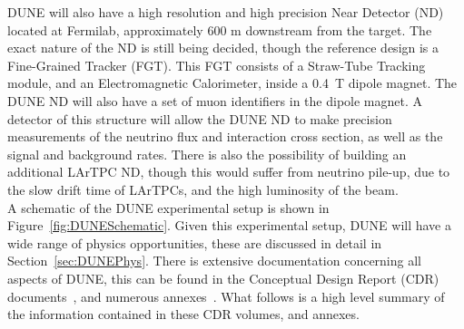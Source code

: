 DUNE will also have a high resolution and high precision Near Detector (ND) located at Fermilab, approximately 600 m downstream from the target. The exact nature of the ND is still being decided, though the reference design is a Fine-Grained Tracker (FGT). This FGT consists of a Straw-Tube Tracking module, and an Electromagnetic Calorimeter, inside a 0.4~T dipole magnet. The DUNE ND will also have a set of muon identifiers in the dipole magnet. A detector of this structure will allow the DUNE ND to make precision measurements of the neutrino flux and interaction cross section, as well as the signal and background rates. There is also the possibility of building an additional LArTPC ND, though this would suffer from neutrino pile-up, due to the slow drift time of LArTPCs, and the high luminosity of the beam. \\

A schematic of the DUNE experimental setup is shown in Figure~\ref{fig:DUNESchematic}. Given this experimental setup, DUNE will have a wide range of physics opportunities, these are discussed in detail in Section~\ref{sec:DUNEPhys}. There is extensive documentation concerning all aspects of DUNE, this can be found in the Conceptual Design Report (CDR) documents~\citep{DUNECDR_V1, DUNECDR_V2, DUNECDR_V3, DUNECDR_V4}, and numerous annexes~\citep{DUNEAtWork}. What follows is a high level summary of the information contained in these CDR volumes, and annexes. \\ 

